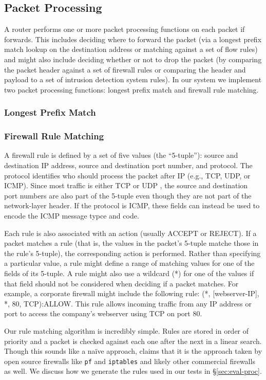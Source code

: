\subsection{Packet Processing}

A router performs one or more packet processing functions on each packet if
forwards. This includes deciding where to forward the packet (via a longest
prefix match lookup on the destination address or matching against a set of
flow rules) and might also include deciding whether or not to drop the packet
(by comparing the packet header against a set of firewall rules or comparing
the header and payload to a set of intrusion detection system rules).  In our
system we implement two packet processing functions: longest prefix match and
firewall rule matching. 

\subsubsection{Longest Prefix Match}

\subsubsection{Firewall Rule Matching}

A firewall rule is defined by a set of five values (the ``5-tuple''): source
and destination IP address, source and destination port number, and protocol.
The protocol identifies who should process the packet after IP (e.g., TCP, UDP,
or ICMP). Since most traffic is either TCP or UDP , the source and
destination port numbers are also part of the 5-tuple even though they are not
part of the network-layer header. If the protocol is ICMP, these fields can
instead be used to encode the ICMP message typce and code.

Each rule is also associated with an action (usually ACCEPT or REJECT). If a
packet matches a rule (that is, the values in the packet's 5-tuple matche those
in the rule's 5-tuple), the corresponding action is performed. Rather than
specifying a particular value, a rule might define a range of matching values
for one of the fields of its 5-tuple. A rule might also use a wildcard (*) for
one of the values if that field should not be considered when deciding if a
packet matches. For example, a corporate firewall might include the following
rule: (*, [webserver-IP], *, 80, TCP):ALLOW. This rule allows incoming traffic
from any IP address or port to access the company's webserver using TCP on port
80.

Our rule matching algorithm is incredibly simple. Rules are stored in order of
priority and a packet is checked against each one after the next in a linear
search. Though this sounds like a na\"{i}ve approach, \cite{Rovniagin} claims
that it is the approach taken by open source firewalls like \texttt{pf} and
\texttt{iptables} and likely other commercial firewalls as well. We discuss how
we generate the rules used in our tests in \S\ref{sec:eval-proc}.

